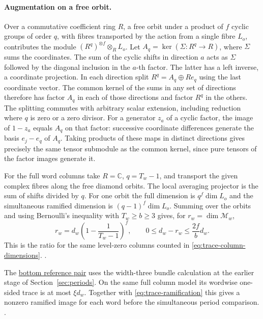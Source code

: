 \paragraph{Augmentation on a free orbit.}
\leavevmode{}%
Over a commutative coefficient ring \(R\), a free orbit under a
product of \(f\) cyclic groups of order \(q\), with fibres
transported by the action from a single fibre \(L_o\), contributes
the module \((R^q)^{\otimes f}\otimes_R L_o\). Let
\(A_q=\ker(\Sigma:R^q\to R)\), where \(\Sigma\) sums the
coordinates. The sum of the cyclic shifts in direction \(a\)
acts as \(\Sigma\) followed by the diagonal inclusion in the
\(a\)-th factor. The latter has a left inverse, a coordinate
projection. In each direction split \(R^q=A_q\oplus Re_q\)
using the last coordinate vector. The common kernel of the sums
in any set of directions therefore has factor \(A_q\) in each of
those directions and factor \(R^q\) in the others. The splitting
commutes with arbitrary scalar extension, including reduction
where \(q\) is zero or a zero divisor. For a generator \(z_a\)
of a cyclic factor, the image of \(1-z_a\) equals \(A_q\) on
that factor: successive coordinate differences generate the
basis \(e_j-e_q\) of \(A_q\). Taking products of these maps in
distinct directions gives precisely the same tensor submodule as
the common kernel, since pure tensors of the factor images
generate it.

For the full word columns take \(R=\mathbb C\), \(q=T_w-1\),
and transport the given complex fibres along the free diamond
orbits. The local averaging projector is the sum of shifts
divided by \(q\). For one orbit the full dimension is
\(q^f\dim L_o\) and the simultaneous ramified dimension is
\((q-1)^f\dim L_o\). Summing over the orbits and using Bernoulli's
inequality with \(T_w\ge b\ge3\) gives, for \(r_w=\dim\mathcal M_w\),
\begin{equation}
 \label{eq:trace-ramification}
 r_w=d_w\left(1-\frac1{T_w-1}\right)^f,\qquad
 0\le d_w-r_w\le\frac{2f}{b}d_w.
\end{equation}
This is the ratio for the same level-zero columns counted in
\eqref{eq:trace-column-dimensions}.
.

The \hyperlink{proof.nonzero-anchor}{bottom reference pair} uses
the width-three bundle calculation at the earlier stage of
Section~\ref{sec:periods}. On the same full column model its
wordwise one-sided trace is at most \(\xi d_w\). Together with
\eqref{eq:trace-ramification} this gives a nonzero ramified image
for each word before the simultaneous period comparison.
.

